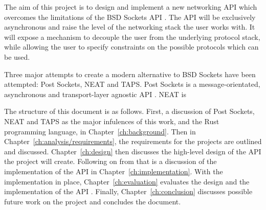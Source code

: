 \documentclass{l4proj}
\begin{document}
The aim of this project is to design and implement a new networking API which overcomes the limitations of the BSD
Sockets API .
The API will be exclusively asynchronous and raise the level of the networking stack the user works with.
It will expose a mechanism to decouple the user from the underlying protocol stack, while allowing the user to specify
constraints on the possible protocols which can be used.

Three major attempts to create a modern alternative to BSD Sockets have been attempted: Post Sockets, NEAT and TAPS.
Post Sockets is a message-orientated, asynchronous and transport-layer agnostic API .
NEAT is

The structure of this document is as follows.
First, a discussion of Post Sockets, NEAT and TAPS as the major infulences of this work, and the Rust programming
language, in Chapter~\ref{ch:background}.
Then in Chapter~\ref{ch:analysis/requirements}, the requirements for the projects are outlined and discussed.
Chapter~\ref{ch:design} then discusses the high-level design of the API the project will create.
Following on from that is a discussion of the implementation of the API in Chapter~\ref{ch:implementation}.
With the implementation in place, Chapter~\ref{ch:evaluation} evaluates the design and the implementation of the API .
Finally, Chapter~\ref{ch:conclusion} discusses possible future work on the project and concludes the document.
\end{document}
